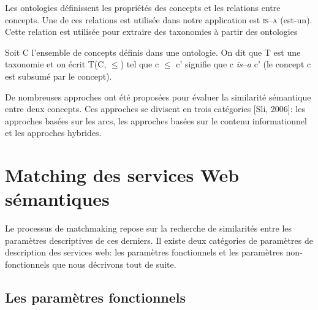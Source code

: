   Les ontologies définissent les propriétés des concepts et les
  relations entre concepts. Une de ces relations est utilisée dans
  notre application est \textsc{is–a} (est-un). Cette relation est utilisée
  pour extraire des taxonomies à partir des ontologies

  \begin{mydef}
    Soit C l'ensemble de concepts définis dans une ontologie. On dit
    que T est une taxonomie et on écrit T(C, $\leq$) tel que c $\leq$
    c' signifie que c \textit{is–a} c' (le concept c est subsumé par
    le concept).
  \end{mydef}

  De nombreuses approches ont été proposées pour évaluer la similarité
  sémantique entre deux concepts. Ces approches se divisent en trois
  catégories [Sli, 2006]: les approches basées sur les arcs, les
  approches basées sur le contenu informationnel et les approches
  hybrides. %

\section{Matching des services Web sémantiques }
\label{sec:match-des-serv-1}
Le processus de matchmaking repose sur la recherche de similarités
entre les paramètres descriptives de ces derniers. Il existe deux
catégories de paramètres de description des services web: les
paramètres fonctionnels et les paramètres non-fonctionnels que nous
décrivons tout de suite.

  \subsection{Les paramètres fonctionnels}
  \label{sec:params-fonc}

